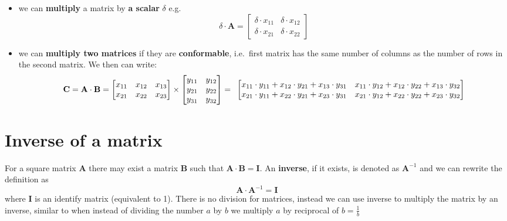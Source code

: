 \documentclass[
]{book}
\providecommand{\tightlist}{%
  \setlength{\itemsep}{0pt}\setlength{\parskip}{0pt}}
\theoremstyle{definition}
\theoremstyle{definition}
\theoremstyle{definition}
\theoremstyle{remark}
\begin{document}
\begin{itemize}
\tightlist
\item
  we can \textbf{multiply} a matrix by \textbf{a scalar} \(\delta\) e.g.~\[\delta \cdot \mathbf{A} = \begin{bmatrix}
  \delta \cdot x_{11} & \delta \cdot x_{12}   \\
  \delta \cdot x_{21} & \delta \cdot x_{22} 
  \end{bmatrix}\]
\end{itemize}

\begin{itemize}
\tightlist
\item
  we can \textbf{multiply two matrices} if they are \textbf{conformable}, i.e.~first matrix has the same number of columns as the number of rows in the second matrix. We then can write:
  \[\mathbf{C} = \mathbf{A} \cdot \mathbf{B}  = \begin{bmatrix}
  x_{11} & x_{12} & x_{13}  \\
  x_{21} & x_{22} & x_{23}
  \end{bmatrix} \times \begin{bmatrix}
  y_{11} & y_{12}   \\
  y_{21} & y_{22}  \\
  y_{31} & y_{32}
  \end{bmatrix} = \\\ 
  \begin{bmatrix}
  x_{11} \cdot y_{11} + x_{12} \cdot y_{21} + x_{13} \cdot y_{31}  & x_{11} \cdot y_{12} + x_{12} \cdot y_{22} + x_{13} \cdot y_{32}  \\
  x_{21} \cdot y_{11} + x_{22} \cdot y_{21} + x_{23} \cdot y_{31} & x_{21} \cdot y_{12} + x_{22} \cdot y_{22} + x_{23} \cdot y_{32}
  \end{bmatrix}\]
\end{itemize}

\hypertarget{inverse-of-a-matrix}{%
\section{Inverse of a matrix}\label{inverse-of-a-matrix}}

For a square matrix \(\mathbf{A}\) there may exist a matrix \(\mathbf{B}\) such that \(\mathbf{A} \cdot \mathbf{B} = \mathbf{I}\). An \textbf{inverse}, if it exists, is denoted as \(\mathbf{A}^{-1}\) and we can rewrite the definition as \[\mathbf{A} \cdot \mathbf{A}^{-1} = \mathbf{I}\] where \(\mathbf{I}\) is an identify matrix (equivalent to 1). There is no division for matrices, instead we can use inverse to multiply the matrix by an inverse, similar to when instead of dividing the number \(a\) by \(b\) we multiply \(a\) by reciprocal of \(b = \frac{1}{b}\)
\end{document}
